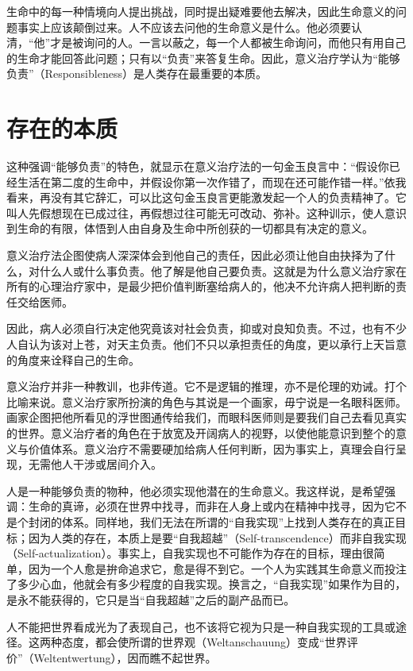 \documentclass[11pt,oneside]{book}
\begin{document}
\begin{common-format}
生命中的每一种情境向人提出挑战，同时提出疑难要他去解决，因此生命意义的问题事实上应该颠倒过来。人不应该去问他的生命意义是什么。他必须要认清，“他”才是被询问的人。一言以蔽之，每一个人都被生命询问，而他只有用自己的生命才能回答此问题；只有以“负责”来答复生命。因此，意义治疗学认为“能够负责”（Responsibleness）是人类存在最重要的本质。


\section{存在的本质}
这种强调“能够负责”的特色，就显示在意义治疗法的一句金玉良言中：“假设你已经生活在第二度的生命中，并假设你第一次作错了，而现在还可能作错一样。”依我看来，再没有其它辞汇，可以比这句金玉良言更能激发起一个人的负责精神了。它叫人先假想现在已成过往，再假想过往可能无可改动、弥补。这种训示，使人意识到生命的有限，体悟到人由自身及生命中所创获的一切都具有决定的意义。

意义治疗法企图使病人深深体会到他自己的责任，因此必须让他自由抉择为了什么，对什么人或什么事负责。他了解是他自己要负责。这就是为什么意义治疗家在所有的心理治疗家中，是最少把价值判断塞给病人的，他决不允许病人把判断的责任交给医师。

因此，病人必须自行决定他究竟该对社会负责，抑或对良知负责。不过，也有不少人自认为该对上苍，对天主负责。他们不只以承担责任的角度，更以承行上天旨意的角度来诠释自己的生命。

意义治疗并非一种教训，也非传道。它不是逻辑的推理，亦不是伦理的劝诫。打个比喻来说。意义治疗家所扮演的角色与其说是一个画家，毋宁说是一名眼科医师。画家企图把他所看见的浮世图通传给我们，而眼科医师则是要我们自己去看见真实的世界。意义治疗者的角色在于放宽及开阔病人的视野，以使他能意识到整个的意义与价值体系。意义治疗不需要硬加给病人任何判断，因为事实上，真理会自行呈现，无需他人干涉或居间介入。

人是一种能够负责的物种，他必须实现他潜在的生命意义。我这样说，是希望强调：生命的真谛，必须在世界中找寻，而非在人身上或内在精神中找寻，因为它不是个封闭的体系。同样地，我们无法在所谓的“自我实现”上找到人类存在的真正目标；因为人类的存在，本质上是要“自我超越”（Self-transcendence）而非自我实现（Self-actualization）。事实上，自我实现也不可能作为存在的目标，理由很简单，因为一个人愈是拚命追求它，愈是得不到它。一个人为实践其生命意义而投注了多少心血，他就会有多少程度的自我实现。换言之，“自我实现”如果作为目的，是永不能获得的，它只是当“自我超越”之后的副产品而已。

人不能把世界看成光为了表现自己，也不该将它视为只是一种自我实现的工具或途径。这两种态度，都会使所谓的世界观（Weltanschauung）变成“世界评价”（Weltentwertung），因而瞧不起世界。


\end{common-format}
\end{document}
